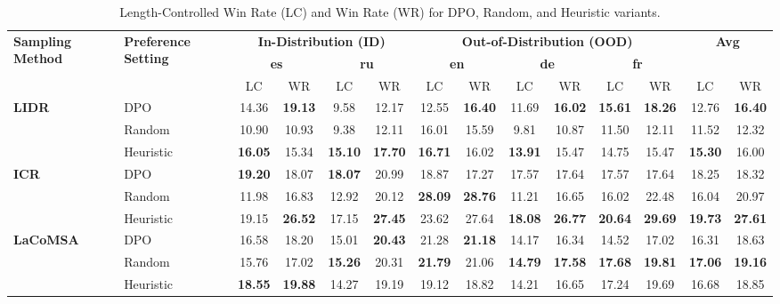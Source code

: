 \begin{table}[t]
\centering
\scriptsize
\setlength{\tabcolsep}{4pt}
\renewcommand{\arraystretch}{1.15}
\begin{tabular}{ll|cc|cc|cc|cc|cc|cc}
\toprule
\multirow{3}{*}{\textbf{Sampling Method}} & \multirow{3}{*}{\textbf{Preference Setting}} & \multicolumn{4}{c|}{\textbf{In-Distribution (ID)}} & \multicolumn{6}{c|}{\textbf{Out-of-Distribution (OOD)}} & \multicolumn{2}{c}{\textbf{Avg}} \\
 & & \multicolumn{2}{c}{\textbf{es}} & \multicolumn{2}{c|}{\textbf{ru}} & \multicolumn{2}{c}{\textbf{en}} & \multicolumn{2}{c}{\textbf{de}} & \multicolumn{2}{c|}{\textbf{fr}} & & \\
 & & LC & WR & LC & WR & LC & WR & LC & WR & LC & WR & LC & WR \\
\midrule
\multirow{3}{*}{\textbf{LIDR}} & DPO & 14.36 & \textbf{19.13} & 9.58 & 12.17 & 12.55 & \textbf{16.40} & 11.69 & \textbf{16.02} & \textbf{15.61} & \textbf{18.26} & 12.76 & \textbf{16.40} \\
 & Random & 10.90 & 10.93 & 9.38 & 12.11 & 16.01 & 15.59 & 9.81 & 10.87 & 11.50 & 12.11 & 11.52 & 12.32 \\
 & Heuristic & \textbf{16.05} & 15.34 & \textbf{15.10} & \textbf{17.70} & \textbf{16.71} & 16.02 & \textbf{13.91} & 15.47 & 14.75 & 15.47 & \textbf{15.30} & 16.00 \\
\midrule
\multirow{3}{*}{\textbf{ICR}} & DPO & \textbf{19.20} & 18.07 & \textbf{18.07} & 20.99 & 18.87 & 17.27 & 17.57 & 17.64 & 17.57 & 17.64 & 18.25 & 18.32 \\
 & Random & 11.98 & 16.83 & 12.92 & 20.12 & \textbf{28.09} & \textbf{28.76} & 11.21 & 16.65 & 16.02 & 22.48 & 16.04 & 20.97 \\
 & Heuristic & 19.15 & \textbf{26.52} & 17.15 & \textbf{27.45} & 23.62 & 27.64 & \textbf{18.08} & \textbf{26.77} & \textbf{20.64} & \textbf{29.69} & \textbf{19.73} & \textbf{27.61} \\
\midrule
\multirow{3}{*}{\textbf{LaCoMSA}} & DPO & 16.58 & 18.20 & 15.01 & \textbf{20.43} & 21.28 & \textbf{21.18} & 14.17 & 16.34 & 14.52 & 17.02 & 16.31 & 18.63 \\
 & Random & 15.76 & 17.02 & \textbf{15.26} & 20.31 & \textbf{21.79} & 21.06 & \textbf{14.79} & \textbf{17.58} & \textbf{17.68} & \textbf{19.81} & \textbf{17.06} & \textbf{19.16} \\
 & Heuristic & \textbf{18.55} & \textbf{19.88} & 14.27 & 19.19 & 19.12 & 18.82 & 14.21 & 16.65 & 17.24 & 19.69 & 16.68 & 18.85 \\
\bottomrule
\end{tabular}
\caption{Length-Controlled Win Rate (LC) and Win Rate (WR) for DPO, Random, and Heuristic variants.}
\label{tab:methods_comparison_random_heuristic}
\end{table}
